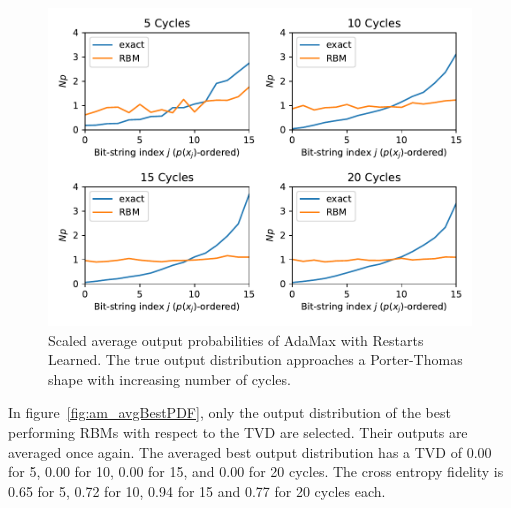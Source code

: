 \begin{figure}[H]
  \centering
  \includegraphics[width=\textwidth]{figures/results/AM-restarts-learned/avgPDF.pdf}
  \caption[Scaled average output probabilities of AdaMax with Restarts Learned]{
    Scaled average output probabilities of AdaMax with Restarts Learned. The true 
    output distribution approaches a Porter-Thomas shape with increasing number of cycles.}
  \label{fig:am_avgPDF}
\end{figure}

In figure~\ref{fig:am_avgBestPDF}, only the output distribution of the best performing RBMs with respect to the 
TVD are selected. Their outputs are averaged once again. The averaged best output distribution 
has a TVD of 0.00 for 5, 0.00 for 10, 0.00 for 15, and 0.00 for 20 
cycles. The cross entropy fidelity is 0.65 for 5, 0.72 for 10, 0.94 for 15 and 0.77 for 20 cycles each. 

